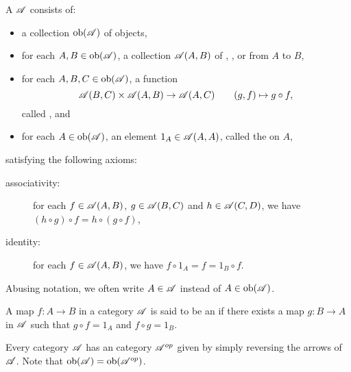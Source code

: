 \begin{definition}
    A  $\mathscr A$ consists of: 
    \begin{itemize}
        \item a collection $\operatorname{ob}(\mathscr A)$ of objects,
        \item for each $A, B\in\operatorname{ob}(\mathscr A)$, a collection $\mathscr A(A, B)$ of , , or  from $A$ to $B$,
        \item for each $A, B, C\in\operatorname{ob}(\mathscr A)$, a function 
        \begin{equation*}
            \mathscr A(B, C)\times\mathscr A(A, B)\to\mathscr A(A, C)\qquad (g, f)\mapsto g\circ f,
        \end{equation*}
        called , and
        \item for each $A\in\operatorname{ob}(\mathscr A)$, an element $1_A\in\mathscr A(A, A)$, called the  on $A$, 
    \end{itemize}
    satisfying the following axioms: 
    \begin{description}
        \item[associativity:] for each $f\in\mathscr A(A, B)$, $g\in\mathscr A(B, C)$ and $h\in\mathscr A(C, D)$, we have $(h\circ g)\circ f = h\circ(g\circ f)$,
        \item[identity:] for each $f\in\mathscr A(A, B)$, we have $f\circ 1_A = f = 1_B\circ f$.
    \end{description}
\end{definition}

Abusing notation, we often write $A\in\mathscr A$ instead of $A\in\operatorname{ob}(\mathscr A)$.

\begin{definition}
    A map $f: A\to B$ in a category $\mathscr A$ is said to be an  if there exists a map $g: B\to A$ in $\mathscr A$ such that $g\circ f = 1_A$ and $f\circ g = 1_B$. 
\end{definition}

\begin{definition}
    Every category $\mathscr A$ has an  category $\mathscr A^{op}$ given by simply reversing the arrows of $\mathscr A$. Note that $\operatorname{ob}(\mathscr A) = \operatorname{ob}(\mathscr A^{op})$.
\end{definition}

